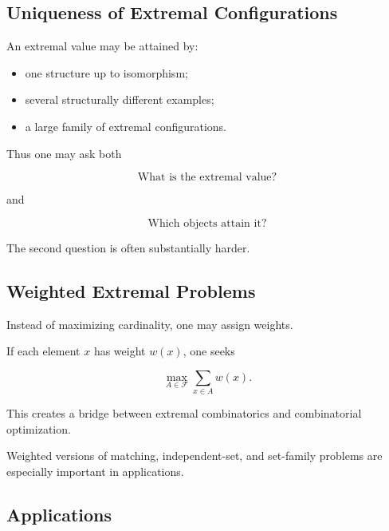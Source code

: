 \subsection{Uniqueness of Extremal Configurations}
\label{subsec:uniqueness-extremal}

An extremal value may be attained by:

\begin{itemize}
    \item one structure up to isomorphism;
    \item several structurally different examples;
    \item a large family of extremal configurations.
\end{itemize}

Thus one may ask both

\[
\boxed{
\text{What is the extremal value?}
}
\]

and

\[
\boxed{
\text{Which objects attain it?}
}
\]

The second question is often substantially harder.

\subsection{Weighted Extremal Problems}
\label{subsec:weighted-extremal-problems}

Instead of maximizing cardinality, one may assign weights.

If each element \(x\) has weight \(w(x)\), one seeks

\[
\boxed{
\max_{A\in\mathcal{F}}
\sum_{x\in A}w(x).
}
\]

This creates a bridge between extremal combinatorics and combinatorial
optimization.

Weighted versions of matching, independent-set, and set-family
problems are especially important in applications.

\subsection{Applications}
\label{subsec:extremal-combinatorics-applications}

